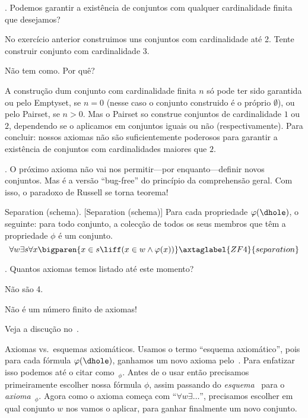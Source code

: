 {\endexercise

\exercise.
\label{only_sets_with_up_to_two_elements}%
Podemos garantir a existência de conjuntos com qualquer cardinalidade finita que desejamos?

\hint
No exercício anterior construimos uns conjuntos com cardinalidade até 2.
Tente construir conjunto com cardinalidade 3.

\hint
Não tem como.  Por quê?

\solution
A construção dum conjunto com cardinalidade finita $n$ só pode ter sido garantida
ou pelo Emptyset, se $n=0$ (nesse caso o conjunto construido é o próprio $\emptyset$),
ou pelo Pairset, se $n>0$.  Mas o Pairset so construe
conjuntos de cardinalidade $1$ ou $2$, dependendo se o aplicamos em conjuntos
iguais ou não (respectivamente).
Para concluir: nossos axiomas não são suficientemente poderosos para garantir
a existência de conjuntos com cardinalidades maiores que $2$.

\endexercise

\note.
O próximo axioma não vai nos permitir---por enquanto---definir novos conjuntos.
Mas é a versão ``bug-free'' do princípio da comprehensão geral.
Com isso, o paradoxo de Russell se torna teorema!

\axiom Separation (schema).
[Separation (schema)]%
\label{separation}%
{\rm Para cada propriedade $\phi(\dhole)$, o seguinte:}
para todo conjunto, a colecção de todos os seus membros que têm a propriedade $\phi$ é um conjunto.
$$
\forall w
\exists s
\forall x
\bigparen{
x\in s
\liff
\paren{
x\in w 
\land
\phi(x)
}
}
\axtaglabel{ZF4}{separation}
$$

\exercise.
Quantos axiomas temos listado até este momento?

\hint
Não são 4.

\hint
Não é um número finito de axiomas!

\solution
Veja a discução no~.

\endexercise

\note Axiomas vs{.}~esquemas axiomáticos.
\label{axioms_vs_axiomatic_schemata}%
Usamos o termo ``esquema axiomático'', pois para cada fórmula $\phi(\dhole)$,
ganhamos um novo axioma pelo~.
Para enfatizar isso podemos até o citar como~$_{\phi}$.
Antes de o usar então precisamos primeiramente escolher nossa fórmula $\phi$, assim passando do \emph{esquema}~
para o \emph{axioma}~$_{\phi}$.
Agora como o axioma começa com ``$\forall w \exists \dots$'',
precisamos escolher em qual conjunto $w$ nos vamos o aplicar,
para ganhar finalmente um novo conjunto.

}
